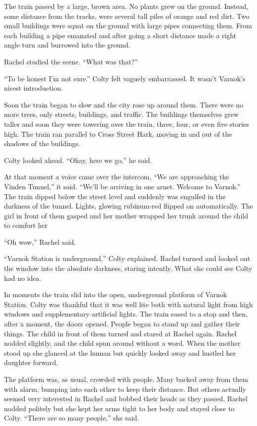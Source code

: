 The train passed by a large, brown area. No plants grew on the ground. Instead, some distance
from the tracks, were several tall piles of orange and red dirt. Two small buildings were squat
on the ground with large pipes connecting them. From each building a pipe emanated and after
going a short distance made a right angle turn and burrowed into the ground.

Rachel studied the scene. ``What was that?''

``To be honest I'm not sure.'' Colty felt vaguely embarrassed. It wasn't Varnok's nicest
introduction.

Soon the train began to slow and the city rose up around them. There were no more trees, only
streets, buildings, and traffic. The buildings themselves grew taller and soon they were
towering over the train, three, four, or even five stories high. The train ran parallel to
Cross Street Hark, moving in and out of the shadows of the buildings.

Colty looked ahead. ``Okay, here we go,'' he said.

At that moment a voice came over the intercom, ``We are approaching the Vinden Tunnel,'' it
said. ``We'll be arriving in one arnet. Welcome to Varnok.'' The train dipped below the street
level and suddenly was engulfed in the darkness of the tunnel. Lights, glowing rubinum-red
flipped on automatically. The girl in front of them gasped and her mother wrapped her trunk
around the child to comfort her

``Oh wow,'' Rachel said.

``Varnok Station is underground,'' Colty explained. Rachel turned and looked out the window into
the absolute darkness, staring intently. What she could see Colty had no idea.

In moments the train slid into the open, underground platform of Varnok Station. Colty was
thankful that it was well lite both with natural light from high windows and supplementary
artificial lights. The train eased to a stop and then, after a moment, the doors opened. People
began to stand up and gather their things. The child in front of them turned and stared at
Rachel again. Rachel nodded slightly, and the child spun around without a word. When the mother
stood up she glanced at the human but quickly looked away and hustled her daughter forward.

The platform was, as usual, crowded with people. Many backed away from them with alarm, bumping
into each other to keep their distance. But others actually seemed very interested in Rachel and
bobbed their heads as they passed. Rachel nodded politely but she kept her arms tight to her
body and stayed close to Colty. ``There are so many people,'' she said.

